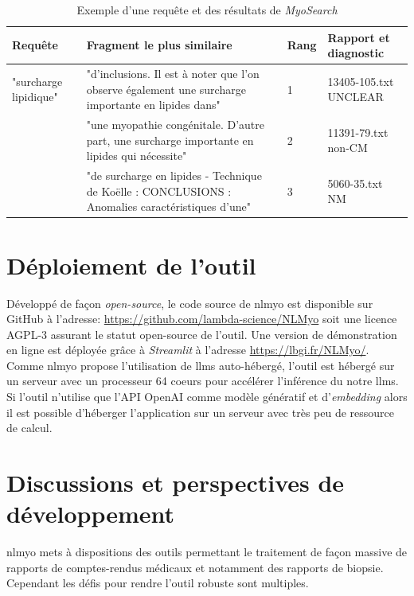 \begin{table}[htbp]
\centering
\caption{Exemple d'une requête et des résultats de \textit{MyoSearch}}
\label{tab:myosearch_results}
\begin{tabularx}{\textwidth}{|l|X|p{1cm}|p{2cm}|}
\hline
\textbf{Requête} & \textbf{Fragment le plus similaire} & \textbf{Rang} & \textbf{Rapport et diagnostic} \\\hline
"surcharge lipidique" & "d’inclusions. Il est à noter que l’on observe également une surcharge importante en lipides dans" \newline & 1 & 13405-105.txt UNCLEAR \\
 & "une myopathie congénitale. D'autre part, une surcharge importante en lipides qui nécessite"\newline & 2 & 11391-79.txt non-CM \\
 & "de surcharge en lipides - Technique de Koëlle : CONCLUSIONS : Anomalies caractéristiques d’une" & 3 & 5060-35.txt NM \\ \hline
\end{tabularx}
\end{table}

\section{Déploiement de l'outil}
Développé de façon \textit{open-source}, le code source de \gls{nlmyo} est disponible sur GitHub à l'adresse: \href{https://github.com/lambda-science/NLMyo}{https://github.com/lambda-science/NLMyo} soit une licence AGPL-3 assurant le statut open-source de l'outil. Une version de démonstration en ligne est déployée grâce à \textit{Streamlit} à l'adresse \href{https://lbgi.fr/NLMyo/}{https://lbgi.fr/NLMyo/}. Comme \gls{nlmyo} propose l'utilisation de \gls{llms} auto-hébergé, l'outil est hébergé sur un serveur avec un processeur 64 coeurs pour accélérer l'inférence du notre \gls{llms}. Si l'outil n'utilise que l'API OpenAI comme modèle génératif et d'\textit{embedding} alors il est possible d'héberger l'application sur un serveur avec très peu de ressource de calcul.

\section{Discussions et perspectives de développement}
\gls{nlmyo} mets à dispositions des outils permettant le traitement de façon massive de rapports de comptes-rendus médicaux et notamment des rapports de biopsie. Cependant les défis pour rendre l'outil robuste sont multiples. 

